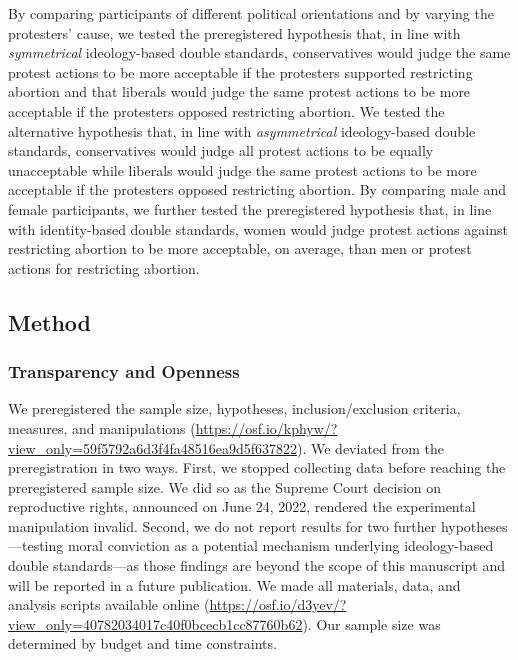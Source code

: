 \documentclass[12pt, letterpaper]{article}
\begin{document}
By comparing participants of different political orientations and by
varying the protesters' cause, we tested the preregistered hypothesis
that, in line with \emph{symmetrical} ideology-based double standards,
conservatives would judge the same protest actions to be more acceptable
if the protesters supported restricting abortion and that liberals would
judge the same protest actions to be more acceptable if the protesters
opposed restricting abortion. We tested the alternative hypothesis that,
in line with \emph{asymmetrical} ideology-based double standards,
conservatives would judge all protest actions to be equally unacceptable
while liberals would judge the same protest actions to be more
acceptable if the protesters opposed restricting abortion. By comparing
male and female participants, we further tested the preregistered
hypothesis that, in line with identity-based double standards, women
would judge protest actions against restricting abortion to be more
acceptable, on average, than men or protest actions for restricting
abortion.

\hypertarget{method-2}{%
\subsection{Method}\label{method-2}}

\hypertarget{transparency-and-openness-2}{%
\subsubsection{Transparency and
Openness}\label{transparency-and-openness-2}}

We preregistered the sample size, hypotheses, inclusion/exclusion
criteria, measures, and manipulations
(\url{https://osf.io/kphyw/?view_only=59f5792a6d3f4fa48516ea9d5f637822}).
We deviated from the preregistration in two ways. First, we stopped
collecting data before reaching the preregistered sample size. We did so
as the Supreme Court decision on reproductive rights, announced on June
24, 2022, rendered the experimental manipulation invalid. Second, we do
not report results for two further hypotheses---testing moral conviction
as a potential mechanism underlying ideology-based double standards---as
those findings are beyond the scope of this manuscript and will be
reported in a future publication. We made all materials, data, and
analysis scripts available online
(\url{https://osf.io/d3yev/?view_only=40782034017c40f0bcecb1cc87760b62}).
Our sample size was determined by budget and time constraints.
\end{document}
